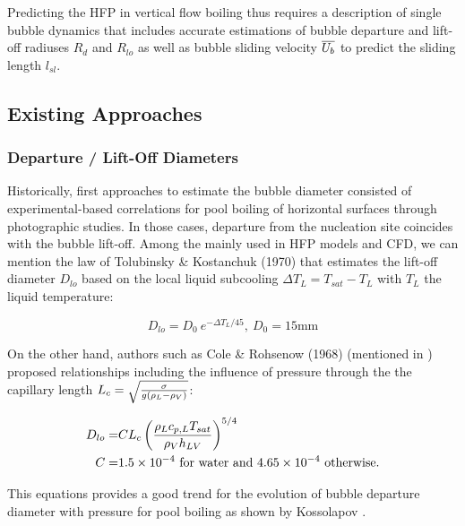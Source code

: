 \npar 

Predicting the HFP in vertical flow boiling thus requires a description of single bubble dynamics that includes accurate estimations of bubble departure and lift-off radiuses $R_{d}$ and $R_{lo}$ as well as bubble sliding velocity $\overline{U_{b}}$ to predict the sliding length $l_{sl}$.

\subsection{Existing Approaches}

\subsubsection{Departure / Lift-Off Diameters}

Historically, first approaches to estimate the bubble diameter consisted of experimental-based correlations for pool boiling of horizontal surfaces through photographic studies. In those cases, departure from the nucleation site coincides with the bubble lift-off. Among the mainly used in HFP models and CFD, we can mention the law of Tolubinsky \& Kostanchuk (1970)\cite{tolubinsky_vapour_1970} that estimates the lift-off diameter $D_{lo}$ based on the local liquid subcooling $\Delta T_{L} = T_{sat} - T_{L}$ with $T_{L}$ the liquid temperature:

\begin{equation}
D_{lo} = D_{0}~e^{-\Delta T_{L}/{45}},\ D_{0}=15\mathrm{mm}
\label{eq:dlo_tolubinsky}
\end{equation}

\npar
On the other hand, authors such as Cole \& Rohsenow (1968) (mentioned in \cite{kocamustafaogullari_pressure_1983}) proposed relationships including the influence of pressure through the the capillary length $L_{c}=\sqrt{\frac{\sigma}{g\left( \rho_{L}-\rho_{V} \right)}}$:

\begin{align}
D_{lo} =& C L_{c} \left( \frac{\rho_{L}c_{p,L}T_{sat}}{\rho_{V}h_{LV}} \right)^{5/4}
\label{eq:dlo_cole_rohsenow}
\\
\nonumber C=&1.5\times 10^{-4}\ \text{for water and }4.65\times 10^{-4}\ \text{otherwise}.
\end{align}

This equations provides a good trend for the evolution of bubble departure diameter with pressure for pool boiling as shown by Kossolapov \cite{kossolapov_experimental_2021}.


